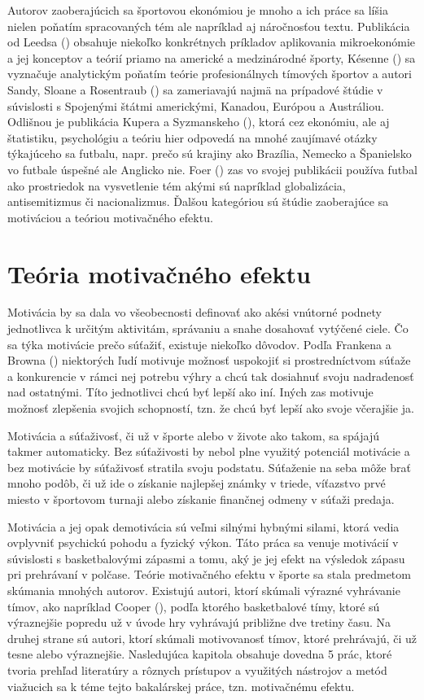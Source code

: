 \documentclass[
  digital, %
  oneside, %
  notable,   %
  lof,     %
  lot,     %
]{fithesis3}
\begin{document}
	Autorov zaoberajúcich sa športovou ekonómiou je mnoho a ich práce sa líšia nielen poňatím spracovaných tém ale napríklad aj náročnosťou textu. Publikácia od Leedsa (\citeyear{leeds2018}) obsahuje niekoľko konkrétnych príkladov aplikovania mikroekonómie a jej konceptov a teórií priamo na americké a medzinárodné športy, Késenne (\citeyear{kesenne2014}) sa vyznačuje analytickým poňatím teórie profesionálnych tímových športov a autori Sandy, Sloane a Rosentraub (\citeyear{sandy2004}) sa zameriavajú najmä na prípadové štúdie v súvislosti s Spojenými štátmi americkými, Kanadou, Európou a Austráliou. Odlišnou je publikácia Kupera a Syzmanskeho (\citeyear{kuper2009}), ktorá cez ekonómiu, ale aj štatistiku, psychológiu a teóriu hier odpovedá na mnohé zaujímavé otázky týkajúceho sa futbalu, napr. prečo sú krajiny ako Brazília, Nemecko a Španielsko vo futbale úspešné ale Anglicko nie. Foer (\citeyear{foer2004}) zas vo svojej publikácii používa futbal ako prostriedok na vysvetlenie tém akými sú napríklad globalizácia, antisemitizmus či nacionalizmus. Ďalšou kategóriou sú štúdie zaoberajúce sa motiváciou a teóriou motivačného efektu.
	
		\section{Teória motivačného efektu}
		Motivácia by sa dala vo všeobecnosti definovať ako akési vnútorné podnety jednotlivca k určitým aktivitám, správaniu a snahe dosahovať vytýčené ciele. Čo sa týka motivácie prečo súťažiť, existuje niekoľko dôvodov. Podľa Frankena a Browna (\citeyear{franken1995}) niektorých ľudí motivuje možnosť uspokojiť si prostredníctvom súťaže a konkurencie v rámci nej potrebu výhry a chcú tak dosiahnuť svoju nadradenosť nad ostatnými. \parencite{nicholls1989} Títo jednotlivci chcú byť lepší ako iní. Iných zas motivuje možnosť zlepšenia svojich schopností, tzn. že chcú byť lepší ako svoje včerajšie ja.
		
		Motivácia a súťaživosť, či už v športe alebo v živote ako takom, sa spájajú takmer automaticky. Bez súťaživosti by nebol plne využitý potenciál motivácie a bez motivácie by súťaživosť stratila svoju podstatu. Súťaženie na seba môže brať mnoho podôb, či už ide o získanie najlepšej známky v triede, víťazstvo prvé miesto v športovom turnaji alebo získanie finančnej odmeny v súťaži predaja. \parencite{tauer1999}
		
		Motivácia a jej opak demotivácia sú veľmi silnými hybnými silami, ktorá vedia ovplyvniť psychickú pohodu a fyzický výkon. Táto práca sa venuje motivácií v súvislosti s basketbalovými zápasmi a tomu, aký je jej efekt na výsledok zápasu pri prehrávaní v polčase. Teórie motivačného efektu v športe sa stala predmetom skúmania mnohých autorov. Existujú autori, ktorí skúmali výrazné vyhrávanie tímov, ako napríklad Cooper (\citeyear{cooper1992}), podľa ktorého basketbalové tímy, ktoré sú výraznejšie popredu už v úvode hry vyhrávajú približne dve tretiny času. Na druhej strane sú autori, ktorí skúmali motivovanosť tímov, ktoré prehrávajú, či už tesne alebo výraznejšie. Nasledujúca kapitola obsahuje dovedna 5 prác, ktoré tvoria prehľad literatúry a rôznych prístupov a využitých nástrojov a metód viažucich sa k téme tejto bakalárskej práce, tzn. motivačnému efektu.
		
\end{document}
